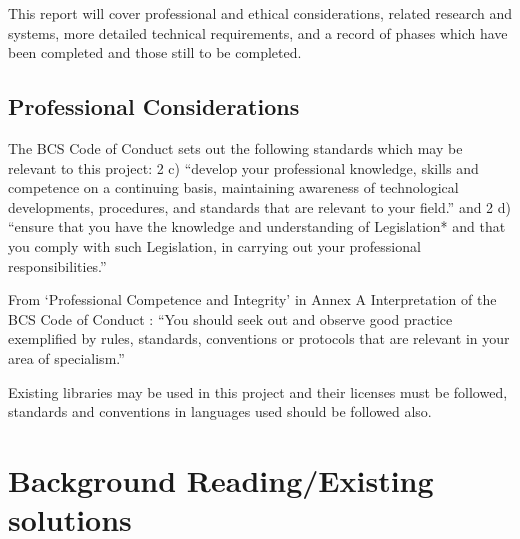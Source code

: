 \documentclass{article}
\begin{document}
This report will cover professional and ethical considerations, related research and systems, more detailed technical requirements, and a record of phases which have been completed and those still to be completed.

\subsection{Professional Considerations}
The BCS Code of Conduct \cite{bcscoc} sets out the following standards which may be relevant to this project: 2 c) “develop your professional knowledge, skills and competence on a continuing basis, maintaining awareness of technological developments, procedures, and standards that are relevant to your field.” and 2 d) “ensure that you have the knowledge and understanding of Legislation* and that you comply with such Legislation, in carrying out your professional responsibilities.”

From ‘Professional Competence and Integrity’ in Annex A Interpretation of the BCS Code of Conduct \cite{bcscoca}: “You should seek out and observe good practice exemplified by rules, standards, conventions or protocols that are relevant in your area of specialism.”

Existing libraries may be used in this project and their licenses must be followed, standards and conventions in languages used should be followed also.




\section{Background Reading/Existing solutions}
\end{document}
